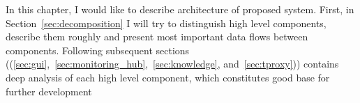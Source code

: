 In this chapter, I would like to describe architecture of proposed system. First, in Section~\ref{sec:decomposition} I
will try to distinguish high level components, describe them roughly and present most important data flows between
components. Following subsequent sections ((\ref{sec:gui},~\ref{sec:monitoring_hub},~\ref{sec:knowledge},
and~\ref{sec:tproxy})) contains deep analysis of each high level component, which constitutes good base for further
development













